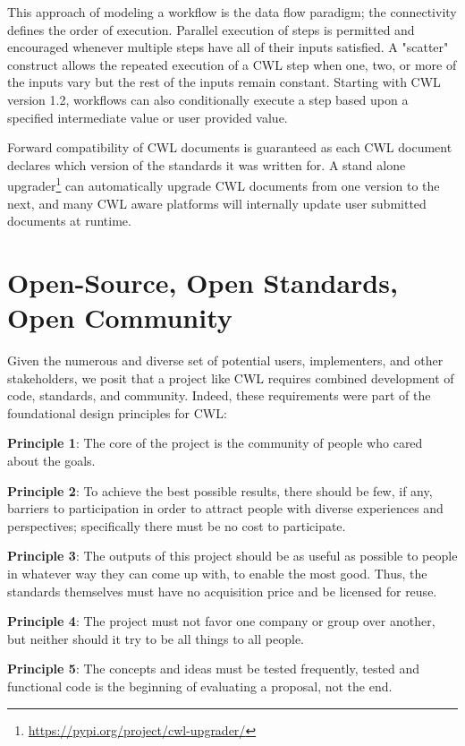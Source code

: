 \documentclass[sigconf,authordraft]{acmart}
\begin{document}
This approach of modeling a workflow is the data flow paradigm;
the connectivity defines the order of execution. Parallel execution of
steps is permitted and encouraged whenever multiple steps have all of
their inputs satisfied. A "scatter" construct allows the repeated
execution of a CWL step when one, two, or more of the inputs vary but
the rest of the inputs remain constant. Starting with CWL version 1.2,
workflows can also conditionally execute a step based upon a specified
intermediate value or user provided value.

Forward compatibility of CWL documents is guaranteed as each CWL
document declares which version of the standards it was written for. A
stand alone upgrader\footnote{\url{https://pypi.org/project/cwl-upgrader/}}
can automatically upgrade CWL documents from one version to the next, and
many CWL aware platforms will internally update user submitted documents
at runtime.

\section{Open-Source, Open Standards, Open Community}

Given the numerous and diverse set of potential users, implementers,
and other stakeholders, we posit that a project like CWL requires
combined development of code, standards, and community. Indeed, these
requirements were part of the foundational design principles for CWL:

\textbf{Principle 1}: The core of the project is the community of people
who cared about the goals.

\textbf{Principle 2}: To achieve the best possible results, there should be
few, if any, barriers to participation in order to attract people with
diverse experiences and perspectives; specifically there must be no
cost to participate.

\textbf{Principle 3}: The outputs of this project should be as useful as
possible to people in whatever way they can come up with, to enable the
most good. Thus, the standards themselves must have no acquisition
price and be licensed for reuse.

\textbf{Principle 4}: The project must not favor one company or group over
another, but neither should it try to be all things to all people.

\textbf{Principle 5}: The concepts and ideas must be tested frequently,
tested and functional code is the beginning of evaluating a proposal,
not the end.
\end{document}
